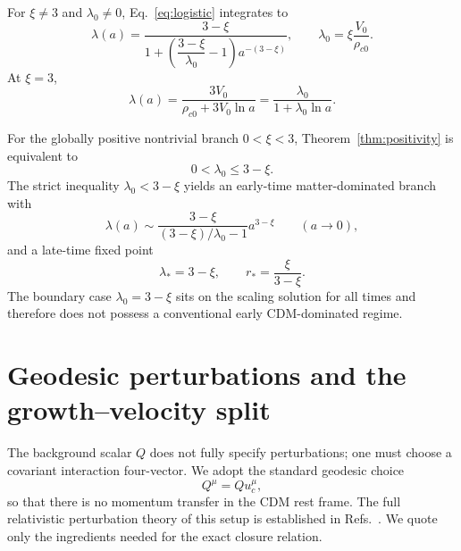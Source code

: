 \documentclass[11pt]{article}
\theoremstyle{remark}
\begin{document}
For $\xi\neq3$ and $\lambda_0\neq0$, Eq.~\eqref{eq:logistic} integrates to
\begin{equation}
    \boxed{
    \lambda(a)
    =\frac{3-\xi}
    {1+\left(\dfrac{3-\xi}{\lambda_0}-1\right)a^{-(3-\xi)}}
    ,}
    \qquad
    \lambda_0=\xi\frac{V_0}{\rho_{c0}}.
    \label{eq:lambdasolution}
\end{equation}
At $\xi=3$,
\begin{equation}
    \lambda(a)=\frac{3V_0}{\rho_{c0}+3V_0\ln a}
    =\frac{\lambda_0}{1+\lambda_0\ln a}.
    \label{eq:lambda3}
\end{equation}

For the globally positive nontrivial branch $0<\xi<3$, Theorem~\ref{thm:positivity} is equivalent to
\begin{equation}
    0<\lambda_0\le3-\xi.
    \label{eq:lambda0bound}
\end{equation}
The strict inequality $\lambda_0<3-\xi$ yields an early-time matter-dominated branch with
\begin{equation}
    \lambda(a)\sim
    \frac{3-\xi}{(3-\xi)/\lambda_0-1}
    a^{3-\xi}
    \qquad(a\to0),
    \label{eq:lambdaearly}
\end{equation}
and a late-time fixed point
\begin{equation}
    \lambda_* =3-\xi,
    \qquad
    r_* =\frac{\xi}{3-\xi}.
    \label{eq:fixedpoints}
\end{equation}
The boundary case $\lambda_0=3-\xi$ sits on the scaling solution for all times and therefore does not possess a conventional early CDM-dominated regime.

\section{Geodesic perturbations and the growth--velocity split}
\label{sec:perturbations}

The background scalar $Q$ does not fully specify perturbations; one must choose a covariant interaction four-vector.  We adopt the standard geodesic choice
\begin{equation}
    Q^\mu=Q u_c^\mu,
    \label{eq:geodesicQ}
\end{equation}
so that there is no momentum transfer in the CDM rest frame.  The full relativistic perturbation theory of this setup is established in Refs.~\cite{Martinelli2019,BorgesWands2020,Kaeonikhom2023}.  We quote only the ingredients needed for the exact closure relation.
\end{document}
